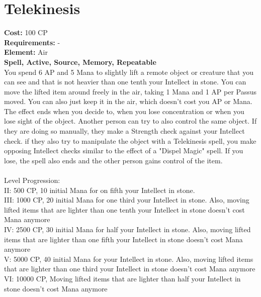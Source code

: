 \section{Telekinesis}
\textbf{Cost:} 100 CP\\
\textbf{Requirements:} -\\
\textbf{Element:} Air\\
\textbf{Spell, Active, Source, Memory, Repeatable}\\
You spend 6 AP and 5 Mana to slightly lift a remote object or creature that you can see and that is not heavier than one tenth your Intellect in stone. You can move the lifted item around freely in the air, taking 1 Mana and 1 AP per Passus moved. You can also just keep it in the air, which doesn't cost you AP or Mana.\\
The effect ends when you decide to, when you lose concentration or when you lose sight of the object. Another person can try to also control the same object. If they are doing so manually, they make a Strength check against your Intellect check. if they also try to manipulate the object with a Telekinesis spell, you make opposing Intellect checks similar to the effect of a "Dispel Magic" spell. If you lose, the spell also ends and the other person gains control of the item.\\
\\
Level Progression:\\
II: 500 CP, 10 initial Mana for on fifth your Intellect in stone.\\
III: 1000 CP, 20 initial Mana for one third your Intellect in stone. Also, moving lifted items that are lighter than one tenth your Intellect in stone doesn't cost Mana anymore\\
IV: 2500 CP, 30 initial Mana for half your Intellect in stone. Also, moving lifted items that are lighter than one fifth your Intellect in stone doesn't cost Mana anymore\\
V: 5000 CP, 40 initial Mana for your Intellect in stone. Also, moving lifted items that are lighter than one third your Intellect in stone doesn't cost Mana anymore\\
VI: 10000 CP, Moving lifted items that are lighter than half your Intellect in stone doesn't cost Mana anymore\\